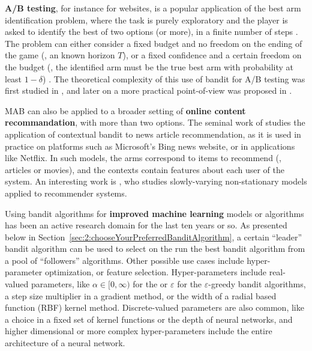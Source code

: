 %
    \textbf{A/B testing}, for instance for websites, is a popular application of the best arm identification problem,
    where the task is purely exploratory and the player is asked to identify the best of two options (or more), in a finite number of steps \cite{audibert2010best}.
    The problem can either consider a fixed budget and no freedom on the ending of the game (\ie, an known horizon $T$), or a fixed confidence and a certain freedom on the budget (\ie, the identified arm must be the true best arm with probability at least $1-\delta$) \cite{Garivier16BAI}.
    The theoretical complexity of this use of bandit for A/B testing was first studied in \cite{Kaufmann14},
    and later on a more practical point-of-view was proposed in \cite{Jamieson17ABTest}.

    MAB can also be applied to a broader setting of \textbf{online content recommandation},
    with more than two options.
    The seminal work of \cite{Li10} studies the application of contextual bandit to news article recommendation, as it is used in practice on platforms such as Microsoft's Bing news website,
    or in applications like Netflix.
    In such models, the arms correspond to items to recommend (\eg, articles or movies), and the contexts contain features about each user of the system.
    An interesting work is \cite{Louedec16}, who studies slowly-varying non-stationary models applied to recommender systems.

    Using bandit algorithms for \textbf{improved machine learning} models or algorithms has been an active research domain for the last ten years or so.
    As presented below in Section~\ref{sec:2:chooseYourPreferredBanditAlgorithm}, a certain ``leader'' bandit algorithm can be used to select on the run the best bandit algorithm from a pool of ``followers'' algorithms.
    Other possible use cases include hyper-parameter optimization, or feature selection.
    Hyper-parameters include real-valued parameters, like $\alpha\in[0,\infty)$ for the \UCB{} or $\varepsilon$ for the $\varepsilon$-greedy bandit algorithms, a step size multiplier in a gradient method, or the width of a radial based function (RBF) kernel method.
    Discrete-valued parameters are also common, like a choice in a fixed set of kernel functions or the depth of neural networks,
    and higher dimensional or more complex hyper-parameters include the entire architecture of a neural network.

